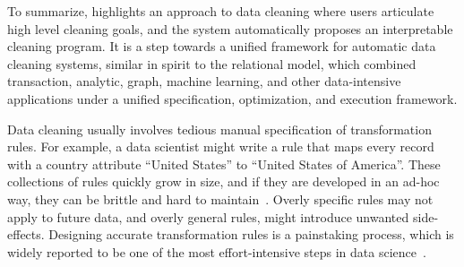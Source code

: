 To summarize, \sys highlights an approach to data cleaning where users articulate high level cleaning goals, and the system automatically proposes an interpretable cleaning program.  It is a step towards a unified framework for automatic data cleaning systems, similar in spirit to the relational model, which combined transaction, analytic, graph, machine learning, and other data-intensive applications under a unified specification, optimization, and execution framework.



% 
% 
% 
% 












Data cleaning usually involves tedious manual specification of transformation rules.
For example, a data scientist might write a rule that maps every record with a \textsf{country} attribute ``United States'' to ``United States of America''.
These collections of rules quickly grow in size, and if they are developed in an ad-hoc way, they can be brittle and hard to maintain~\cite{krishnan2016hilda}.
Overly specific rules may not apply to future data, and overly general rules, might introduce unwanted side-effects.
Designing accurate transformation rules is a painstaking process, which is widely reported to be one of the most effort-intensive steps in data science~\cite{nytimes}.

